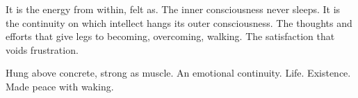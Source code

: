 

﻿It is the energy from within, felt as.  The inner consciousness never
sleeps.  It is the continuity on which intellect hangs its outer
consciousness.  The thoughts and efforts that give legs to becoming,
overcoming, walking.  The satisfaction that voids frustration.

Hung above concrete, strong as muscle.  An emotional continuity.
Life.  Existence.  Made peace with waking.

\bye
